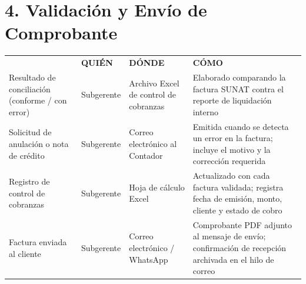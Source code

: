 \documentclass[11pt,letterpaper]{report}
\begin{document}
\vspace{2em}

\section*{4. Validación y Envío de Comprobante}
\begin{tabularx}{\textwidth}{>{\raggedright\arraybackslash}X >{\raggedright\arraybackslash}p{} >{\raggedright\arraybackslash}p{} >{\raggedright\arraybackslash}X}
\toprule
\multirow{2}{*}{\textbf{DOCUMENTO (QUÉ)}} & \multicolumn{3}{c}{\textbf{CUSTODIA}} \\
\cmidrule{2-4}
& \textbf{QUIÉN} & \textbf{DÓNDE} & \textbf{CÓMO} \\
\midrule
Resultado de conciliación (conforme / con error) & Subgerente & Archivo Excel de control de cobranzas & Elaborado comparando la factura SUNAT contra el reporte de liquidación interno \\
\midrule
Solicitud de anulación o nota de crédito & Subgerente & Correo electrónico al Contador & Emitida cuando se detecta un error en la factura; incluye el motivo y la corrección requerida \\
\midrule
Registro de control de cobranzas & Subgerente & Hoja de cálculo Excel & Actualizado con cada factura validada; registra fecha de emisión, monto, cliente y estado de cobro \\
\midrule
Factura enviada al cliente & Subgerente & Correo electrónico / WhatsApp & Comprobante PDF adjunto al mensaje de envío; confirmación de recepción archivada en el hilo de correo \\
\bottomrule
\end{tabularx}

\vspace{2em}

\end{document}
